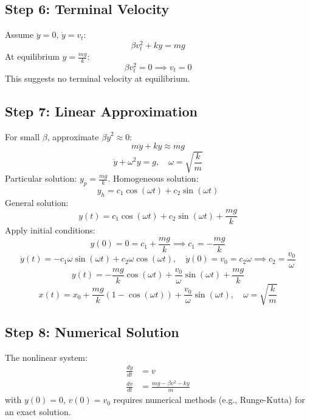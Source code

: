 \documentclass[a4paper,12pt]{article}
\begin{document}
\subsection*{Step 6: Terminal Velocity}
Assume \(\ddot{y} = 0\), \(\dot{y} = v_t\):
\[
\beta v_t^2 + k y = mg
\]
At equilibrium \(y = \frac{mg}{k}\):
\[
\beta v_t^2 = 0 \implies v_t = 0
\]
This suggests no terminal velocity at equilibrium.

\subsection*{Step 7: Linear Approximation}
For small \(\beta\), approximate \(\beta \dot{y}^2 \approx 0\):
\begin{equation}
m \ddot{y} + k y \approx mg
\end{equation}
\[
\ddot{y} + \omega^2 y = g, \quad \omega = \sqrt{\frac{k}{m}}
\]
Particular solution: \(y_p = \frac{mg}{k}\). Homogeneous solution:
\[
y_h = c_1 \cos(\omega t) + c_2 \sin(\omega t)
\]
General solution:
\begin{equation}
y(t) = c_1 \cos(\omega t) + c_2 \sin(\omega t) + \frac{mg}{k}
\end{equation}
Apply initial conditions:
\[
y(0) = 0 = c_1 + \frac{mg}{k} \implies c_1 = -\frac{mg}{k}
\]
\[
\dot{y}(t) = -c_1 \omega \sin(\omega t) + c_2 \omega \cos(\omega t), \quad \dot{y}(0) = v_0 = c_2 \omega \implies c_2 = \frac{v_0}{\omega}
\]
\[
y(t) = -\frac{mg}{k} \cos(\omega t) + \frac{v_0}{\omega} \sin(\omega t) + \frac{mg}{k}
\]
\[
x(t) = x_0 + \frac{mg}{k} \left(1 - \cos(\omega t)\right) + \frac{v_0}{\omega} \sin(\omega t), \quad \omega = \sqrt{\frac{k}{m}}
\]

\subsection*{Step 8: Numerical Solution}
The nonlinear system:
\begin{align}
\frac{dy}{dt} &= v \\
\frac{dv}{dt} &= \frac{mg - \beta v^2 - k y}{m}
\end{align}
with \(y(0) = 0\), \(v(0) = v_0\) requires numerical methods (e.g., Runge-Kutta) for an exact solution.

\end{document}

